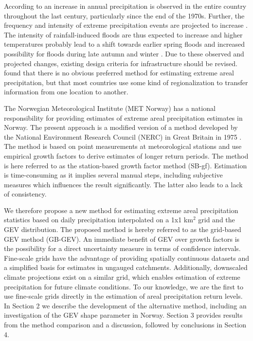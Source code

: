 \documentclass[12pt,a4paper,english]{article}
\begin{document}
According to \cite{Hanssen-Baueretal2009} an increase in annual precipitation is observed in the entire country throughout the last century, particularly since the end of the 1970s. Further, the frequency and intensity of extreme precipitation events are projected to increase \citep{Hanssen-Baueretal2009,SREX2012}. The intensity of rainfall-induced floods are thus expected to increase and higher temperatures probably lead to a shift towards earlier spring floods and increased possibility for floods during late autumn and winter \citep{Wilsonetal2010, Hanssen-Baueretal2009, Hisdaletal2006}. Due to these observed and projected changes, existing design criteria for infrastructure should be revised. \cite{SvenssonandJones2010a} found that there is no obvious preferred method for estimating extreme areal precipitation, but that most countries use some kind of regionalization to transfer information from one location to another. 

The Norwegian Meteorological Institute (MET Norway) has a national responsibility for providing estimates of extreme areal precipitation estimates in Norway. The present approach \citep{ForlandandKristoffersen1989, Forland1992} is a modified version of a method developed by the National Environment Research Council (NERC) in Great Britain in 1975 \citep{NERC1975}. The method is based on point measurements at meteorological stations and use empirical growth factors to derive estimates of longer return periods. The method is here referred to as the station-based growth factor method (SB-gf). Estimation is time-consuming as it implies several manual steps, including subjective measures which influences the result significantly. The latter also leads to a lack of consistency. 

We therefore propose a new method for estimating extreme areal precipitation statistics based on daily precipitation interpolated on a 1x1 km$^2$ grid \citep{Tveitoetal2005, Mohr2009, Janssonetal2007} and the GEV distribution. The proposed method is hereby referred to as the grid-based GEV method (GB-GEV). An immediate benefit of GEV over growth factors is the possibility for a direct uncertainty measure in terms of confidence intervals. Fine-scale grids have the advantage of providing spatially continuous datasets and a simplified basis for estimates in ungauged catchments. Additionally, downscaled climate projections exist on a similar grid, which enables estimation of extreme precipitation for future climate conditions. To our knowledge, we are the first to use fine-scale grids directly in the estimation of areal precipitation return levels. %
In Section 2 we describe the development of the alternative method, including an investigation of the GEV shape parameter in Norway. Section 3 provides results from the method comparison and a discussion, followed by conclusions in Section 4.
\end{document}
